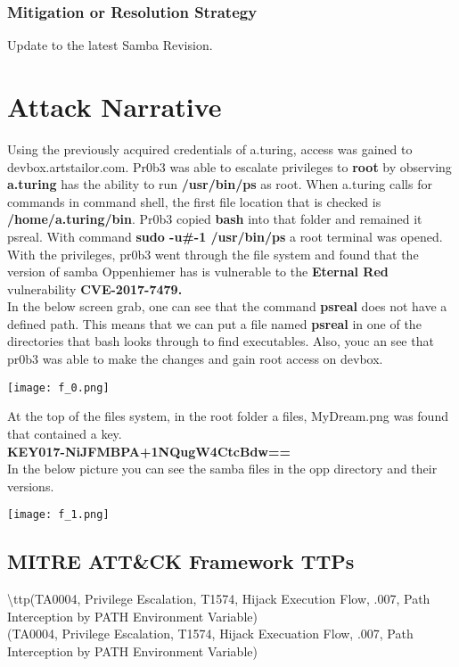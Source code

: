 \documentclass[notitlepage]{article}
\begin{document}
	\subsubsection{Mitigation or Resolution Strategy}
	\indent Update to the latest Samba Revision.  
	
	\section{Attack Narrative}
	\indent Using the previously acquired credentials of a.turing, access was gained to devbox.artstailor.com.  Pr0b3 was able to escalate privileges to \textbf{root} by observing \textbf{a.turing} has the ability to run\textbf{ /usr/bin/ps} as root.  When a.turing calls for commands in command shell, the first file location that is checked is \textbf{/home/a.turing/bin}.  Pr0b3 copied \textbf{bash} into that folder and remained it psreal.  With command \textbf{sudo -u\#-1 /usr/bin/ps} a root terminal was opened. With the privileges, pr0b3 went through the file system and found that the version of samba Oppenhiemer has is vulnerable to the \textbf{Eternal Red} vulnerability \textbf{ CVE-2017-7479.} \\
	
	\indent In the below screen grab, one can see that the command \textbf{psreal} does not have a defined path.  This means that we can put a file named \textbf{psreal} in one of the directories that bash looks through to find executables. Also, youc an see that pr0b3 was able to make the changes and gain root access on devbox.   
	
	\texttt{[image: f\_0.png]}
	
	\indent At the top of the files system, in the root folder a files, MyDream.png was found that contained a key. \\
	\textbf{KEY017-NiJFMBPA+1NQugW4CtcBdw==} \\
	
	\indent In the below picture you can see the samba files in the opp directory and their versions.  
	
	
	
	\texttt{[image: f\_1.png]}
	
	\subsection{MITRE ATT{\&}CK Framework TTPs}
	
	\indent\textbackslash ttp(TA0004, Privilege Escalation, T1574, Hijack Execution Flow, .007, Path Interception by PATH Environment Variable) \\
	\ttp(TA0004, Privilege Escalation, T1574, Hijack Execuation Flow, .007, Path Interception by PATH Environment Variable) \\
	
\end{document}
